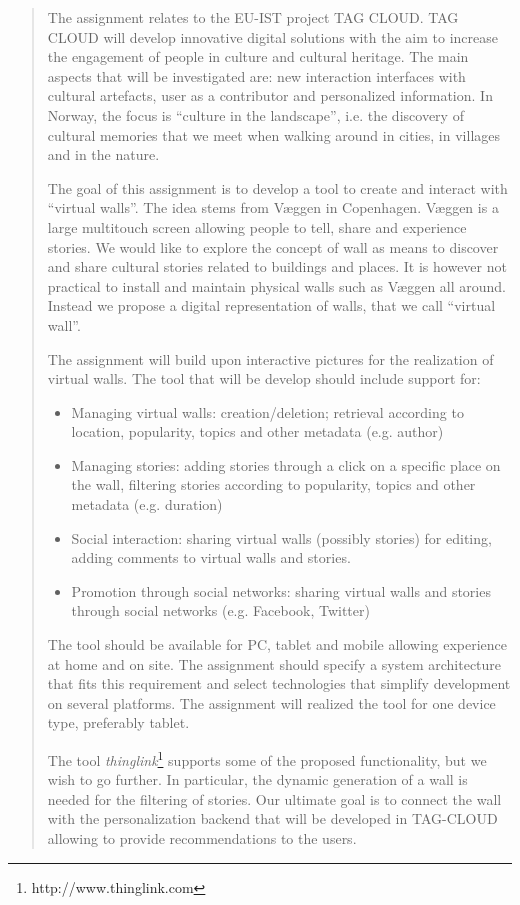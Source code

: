 \documentclass[11pt]{book}
\begin{document}
\begin{quotation}\noindent
The assignment relates to the EU-IST project TAG CLOUD. TAG CLOUD will develop innovative digital solutions with the aim to increase the engagement of people in culture and cultural heritage. The main aspects that will be investigated are: new interaction interfaces with cultural artefacts, user as a contributor and personalized information. In Norway, the focus is ``culture in the landscape'', i.e. the discovery of cultural memories that we meet when walking around in cities, in villages and in the nature.

The goal of this assignment is to develop a tool to create and interact with ``virtual walls''. The idea stems from Væggen in Copenhagen. Væggen is a large multitouch screen allowing people to tell, share and experience stories. We would like to explore the concept of wall as means to discover and share cultural stories related to buildings and places. It is however not practical to install and maintain physical walls such as Væggen all around. Instead we propose a digital representation of walls, that we call ``virtual wall''.

The assignment will build upon interactive pictures for the realization of virtual walls. The tool that will be develop should include support for:
\begin{itemize}
    \item Managing virtual walls: creation/deletion; retrieval according to location, popularity, topics and other metadata (e.g. author)
    \item Managing stories: adding stories through a click on a specific place on the wall, filtering stories
according to popularity, topics and other metadata (e.g. duration)
    \item Social interaction: sharing virtual walls (possibly stories) for editing, adding comments to virtual walls and stories.
    \item Promotion through social networks: sharing virtual walls and stories through social networks (e.g. Facebook, Twitter)
\end{itemize}
The tool should be available for PC, tablet and mobile allowing experience at home and on site. The assignment should specify a system architecture that fits this requirement and select technologies that simplify development on several platforms. The assignment will realized the tool for one device type, preferably tablet.

The tool \emph{thinglink}\footnote{http://www.thinglink.com} supports some of the proposed functionality, but we wish to go further. In particular, the dynamic generation of a wall is needed for the filtering of stories. Our ultimate goal is to connect the wall with the personalization backend that will be developed in TAG-CLOUD allowing to provide recommendations to the users.


\end{quotation}
\end{document}
